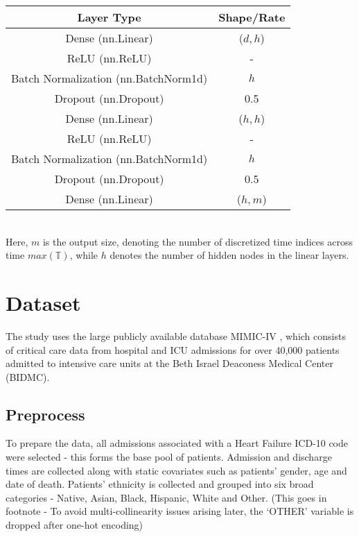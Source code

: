 \documentclass[%
 reprint,
 amsmath,amssymb,
 aps,
]{revtex4-2}
\begin{document}
\begin{tabular}{|c|c|}
    \hline
    Layer Type & Shape/Rate \\
    \hline
    Dense (nn.Linear) & ($d, h$) \\
    \hline
    ReLU (nn.ReLU) & - \\
    \hline
    Batch Normalization (nn.BatchNorm1d) & $h$ \\
    \hline
    Dropout (nn.Dropout) & 0.5 \\
    \hline    
    Dense (nn.Linear) & ($h, h$) \\
    \hline
    ReLU (nn.ReLU) & - \\
    \hline
    Batch Normalization (nn.BatchNorm1d) & $h$ \\
    \hline
    Dropout (nn.Dropout) & 0.5\\
    \hline
    Dense (nn.Linear) & ($h , m$)\\
    \hline
\end{tabular}\\

Here, $m$ is the output size, denoting the number of discretized time indices across time $max(\mathbb{T})$, while $h$ denotes the number of hidden nodes in the linear layers.

\section{\label{data}Dataset}
The study uses the large publicly available database MIMIC-IV \cite{mimic_iv}, which consists of critical care data from hospital and ICU admissions for over 40,000 patients admitted to intensive care units at the Beth Israel Deaconess Medical Center (BIDMC). 
\subsection{\label{preprocess}Preprocess}
To prepare the data, all admissions associated with a Heart Failure ICD-10 code were selected - this forms the base pool of patients. Admission and discharge times are collected along with static covariates such as patients' gender, age and date of death. Patients' ethnicity is collected and grouped into six broad categories - Native, Asian, Black, Hispanic, White and Other. (This goes in footnote - To avoid multi-collinearity issues arising later, the `OTHER' variable is dropped after one-hot encoding)\\
\end{document}
